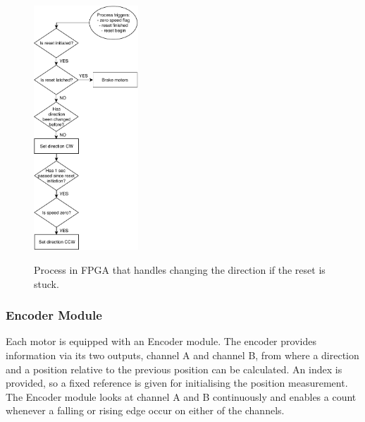 \documentclass[../../main.tex]{subfiles}
\begin{document}
\begin{figure}
\centering
\caption{Process in FPGA that handles changing the direction if the reset is stuck.}
\includegraphics[width = 0.35\textwidth]{Sections/System_Implementation/Images/FPGAFlowchartsResetDirection.pdf}
\label{fig:FPGAFlowchartsResetDirection}
\end{figure}

\subsubsection*{Encoder Module}

Each motor is equipped with an Encoder module. The encoder provides information via its two outputs, channel A and channel B, from where a direction and a position relative to the previous position can be calculated. An index is provided, so a fixed reference is given for initialising the position measurement. The Encoder module looks at channel A and B continuously and enables a count whenever a falling or rising edge occur on either of the channels. %


\end{document}
